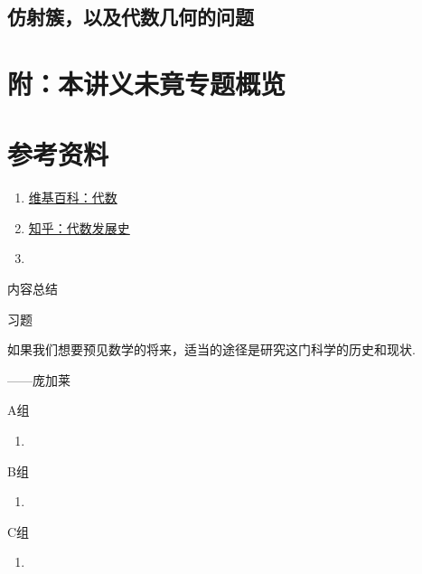 \subsection{仿射簇，以及代数几何的问题}

\section*{附：本讲义未竟专题概览}

\section*{参考资料}

\begin{enumerate}
    \item \href{https://zh.wikipedia.org/wiki/%E4%BB%A3%E6%95%B0}{维基百科：代数}

    \item \href{https://zhuanlan.zhihu.com/p/574858845}{知乎：代数发展史}

    \item
\end{enumerate}
\vspace{2ex}
\centerline{\heiti \Large 内容总结}

\vspace{2ex}
\centerline{\heiti \Large 习题}

\vspace{2ex}
{\kaishu 如果我们想要预见数学的将来，适当的途径是研究这门科学的历史和现状.}
\begin{flushright}
    \kaishu
    ——庞加莱
\end{flushright}

\centerline{\heiti A组}
\begin{enumerate}
    \item
\end{enumerate}

\centerline{\heiti B组}
\begin{enumerate}
    \item
\end{enumerate}

\centerline{\heiti C组}
\begin{enumerate}
    \item
\end{enumerate}
